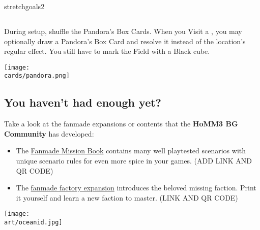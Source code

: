 \begin{multicols*}{2}
\begin{expansion}{stretchgoals2}
  \subsection*{}
  During setup, shuffle the Pandora's Box Cards.
  When you Visit a , you may optionally draw a Pandora's Box Card and resolve it instead of the location's regular effect.
  You still have to mark the Field with a Black cube.

  \medskip
  \begin{center}
    \texttt{[image: \\cards/pandora.png]}
  \end{center}
\end{expansion}

\vspace*{1em}
\subsection*{You haven't had enough yet?}
Take a look at the fanmade expansions or contents that the \textbf{HoMM3 BG Community} has developed:
\begin{itemize}
	\item The \href{https://github.com/qwrtln/Homm3BG-mission-book}{Fanmade Mission Book} contains many well playtested scenarios with unique scenario rules for even more spice in your games. (ADD LINK AND QR CODE)
	\item The \href{https://github.com/piotrbruzda/Homm3BG-FactoryRulebook}{fanmade factory expansion} introduces the beloved missing faction. Print it yourself and learn a new faction to master. (LINK AND QR CODE)
\end{itemize}



\columnbreak

\texttt{[image: \\art/oceanid.jpg]}

\end{multicols*}
